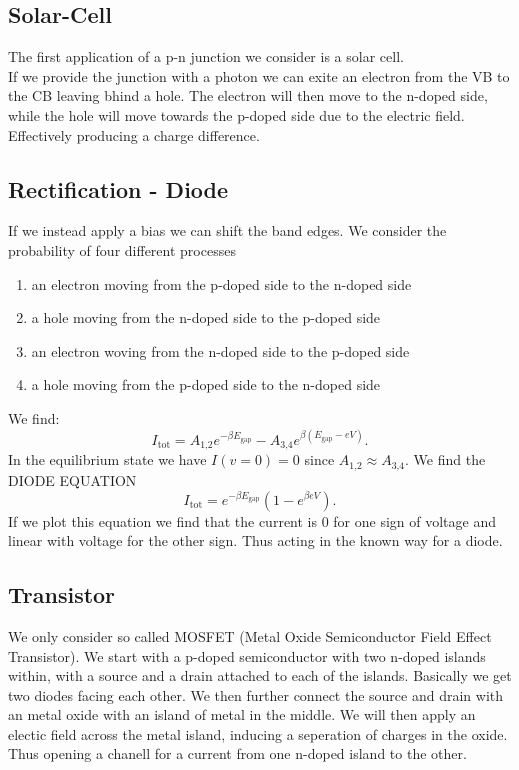 \documentclass{report}
\begin{document}
\subsection{Solar-Cell}
The first application of a p-n junction we consider is a solar cell.\\
If we provide the junction with a photon we can exite an electron from the VB to the CB leaving bhind a hole. The electron will then move to the n-doped side, while the hole will move towards the p-doped side due to the electric field. Effectively producing a charge difference.
\subsection{Rectification - Diode}
If we instead apply a bias we can shift the band edges. We consider the probability of four different processes
\begin{enumerate}
	\item an electron moving from the p-doped side to the n-doped side
	\item a hole moving from the n-doped side to the p-doped side
	\item an electron woving from the n-doped side to the p-doped side
	\item a hole moving from the p-doped side to the n-doped side
\end{enumerate}
We find: \[
	I_\text{tot} = A_\text{1,2} e^{-\beta E_\text{gap}} - A_\text{3,4} e^{\beta\left( E_\text{gap} - eV \right) }
	.\] In the equilibrium state we have $I(v=0) = 0$ since $A_\text{1,2} \approx A_\text{3,4}$. We find the DIODE EQUATION \[
I_\text{tot} = e^{-\beta E_\text{gap}} \left( 1 - e^{\beta eV} \right)
.\] 
If we plot this equation we find that the current is $0$ for one sign of voltage and linear with voltage for the other sign. Thus acting in the known way for a diode.
\subsection{Transistor}
We only consider so called MOSFET (Metal Oxide Semiconductor Field Effect Transistor). We start with a p-doped semiconductor with two n-doped islands within, with a source and a drain attached to each of the islands. Basically we get two diodes facing each other. We then further connect the source and drain with an metal oxide with an island of metal in the middle. We will then apply an electic field across the metal island, inducing a seperation of charges in the oxide. Thus opening a chanell for a current from one n-doped island to the other.\\
\end{document}
